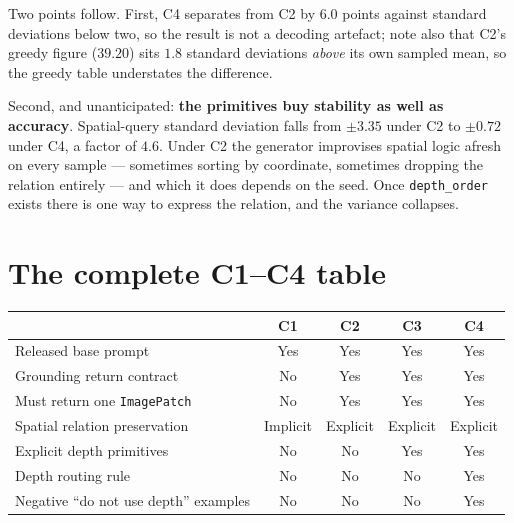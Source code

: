 \documentclass[11pt,a4paper]{article}
\begin{document}
Two points follow. First, C4 separates from C2 by $6.0$ points against standard
deviations below two, so the result is not a decoding artefact; note also that C2's
greedy figure ($39.20$) sits $1.8$ standard deviations \emph{above} its own sampled
mean, so the greedy table understates the difference.

Second, and unanticipated: \textbf{the primitives buy stability as well as accuracy}.
Spatial-query standard deviation falls from $\pm 3.35$ under C2 to $\pm 0.72$ under
C4, a factor of $4.6$. Under C2 the generator improvises spatial logic afresh on every
sample --- sometimes sorting by coordinate, sometimes dropping the relation entirely
--- and which it does depends on the seed. Once \texttt{depth\_order} exists there is
one way to express the relation, and the variance collapses.

\section{The complete C1--C4 table}

\begin{center}
\begin{tabular}{@{}lcccc@{}}
\toprule
& \textbf{C1} & \textbf{C2} & \textbf{C3} & \textbf{C4} \\
\midrule
Released base prompt                    & Yes      & Yes      & Yes  & Yes \\
Grounding return contract               & No       & Yes      & Yes  & Yes \\
Must return one \texttt{ImagePatch}     & No       & Yes      & Yes  & Yes \\
Spatial relation preservation           & Implicit & Explicit & Explicit & Explicit \\
Explicit depth primitives               & No       & No       & Yes  & Yes \\
Depth routing rule                      & No       & No       & No   & Yes \\
Negative ``do not use depth'' examples  & No       & No       & No   & Yes \\
\bottomrule
\end{tabular}
\end{center}

\begin{center}
\end{center}
\end{document}
